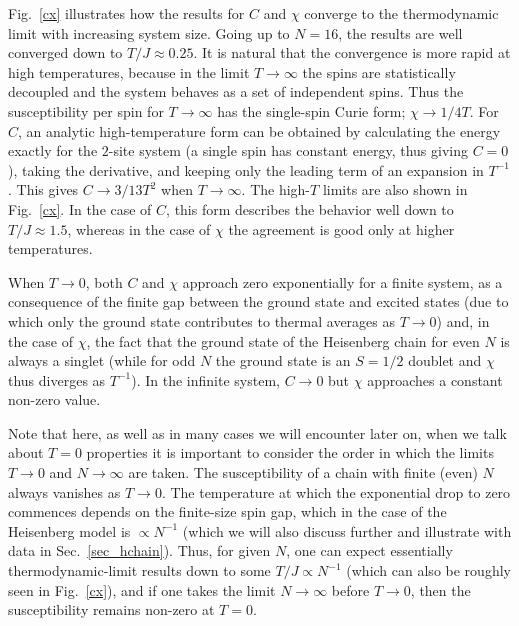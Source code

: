 \documentclass[draft,numberedheadings]{aipproc}
\begin{document}
Fig.~\ref{cx} illustrates how the results for $C$ and $\chi$ converge to the thermodynamic limit with increasing system size. Going up to $N=16$, the results 
are well converged down to $T/J \approx 0.25$. It is natural that the convergence is more rapid at high temperatures, because in the limit $T \to \infty$ 
the spins are statistically decoupled and the system behaves as a set of independent spins. Thus the susceptibility per spin for $T \to \infty$ has the single-spin
Curie form; $\chi \to 1/4T$. For $C$, an analytic high-temperature form can be obtained by calculating the energy exactly for the $2$-site system 
(a single spin has constant energy, thus giving $C=0$), taking the derivative, and keeping only the leading term of an expansion in $T^{-1}$. This gives 
$C \to 3/13T^2$ when $T \to \infty$. The high-$T$ limits are also shown in Fig.~\ref{cx}. In the case of $C$, this form describes the behavior well 
down to $T/J \approx 1.5$, whereas in the case of $\chi$ the agreement is good only at higher temperatures.

When $T \to 0$, both $C$ and $\chi$ approach zero exponentially for a finite system, as a consequence of the finite gap between the ground state and excited 
states (due to which only the ground state contributes to thermal averages as $T \to 0$) and, in the case of $\chi$, the fact that the ground state of the 
Heisenberg chain for even $N$ is always a singlet (while for odd $N$ the ground state is an $S=1/2$ doublet and $\chi$ thus diverges as $T^{-1}$). In the 
infinite system, $C \to 0$ but $\chi$ approaches a constant non-zero value. 

Note that here, as well as in many cases we will encounter later on, when we talk about $T=0$ properties it is important to consider the order in which the 
limits $T \to 0$ and $N \to \infty$ are taken. The susceptibility of a chain with finite (even) $N$ always vanishes as $T\to 0$. The temperature at which the 
exponential drop to zero commences depends on the finite-size spin gap, which in the case of the Heisenberg model is $\propto N^{-1}$ (which we will also discuss
further and illustrate with data in Sec.~\ref{sec_hchain}). Thus, for given $N$, one can expect essentially thermodynamic-limit results down to some 
$T/J \propto N^{-1}$ (which can also be roughly seen in Fig.~\ref{cx}), and if one takes the limit $N \to \infty$ before $T \to 0$, then the susceptibility 
remains non-zero at $T=0$.
 
\end{document}
